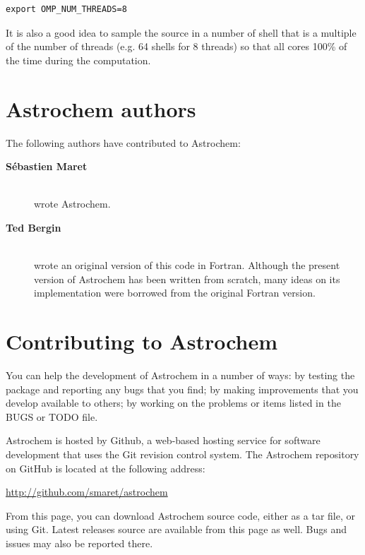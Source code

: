 \documentclass[a4paper,12pt]{article}
\begin{document}
\begin{verbatim}
export OMP_NUM_THREADS=8
\end{verbatim}

\noindent
It is also a good idea to sample the source in a number of shell that
is a multiple of the number of threads (e.g. 64 shells for 8 threads)
so that all cores 100\% of the time during the computation.




\newpage
\appendix

\section{Astrochem authors}
\label{sec:astrochem-authors}

The following authors have contributed to Astrochem:

\begin{description}

\item[{\bf S\'ebastien Maret}] \hfill \\
  wrote Astrochem.

\item[{\bf Ted Bergin}] \hfill \\
  wrote an original version of this code in Fortran. Although the
  present version of Astrochem has been written from scratch, many
  ideas on its implementation were borrowed from the original Fortran
  version.

\end{description}

\section{Contributing to Astrochem}
\label{sec:contr-astr}

You can help the development of Astrochem in a number of ways: by
testing the package and reporting any bugs that you find; by making
improvements that you develop available to others; by working on the
problems or items listed in the BUGS or TODO file.

Astrochem is hosted by Github, a web-based hosting service for
software development that uses the Git revision control system. The
Astrochem repository on GitHub is located at the following address:

\noindent
\url{http://github.com/smaret/astrochem}

\noindent
From this page, you can download Astrochem source code, either as a
tar file, or using Git. Latest releases source are available from this
page as well. Bugs and issues may also be reported there.
\end{document}
